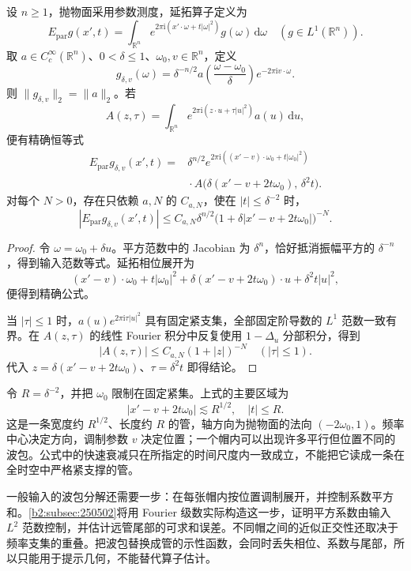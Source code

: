 \begin{proposition}[抛物面的单波包模型]\label{b2:prop:23-parabolic-packet}
设 \(n\geq1\)，抛物面采用参数测度，延拓算子定义为
\[
 E_{\mathrm{par}}g(x',t)
 =\int_{\mathbb R^n}e^{2\pi\mathrm i(x'\cdot\omega+t|\omega|^2)}
      g(\omega)\,\mathrm d\omega
 \quad(g\in L^1(\mathbb R^n)).
\]
取 \(a\in C_c^\infty(\mathbb R^n)\)、\(0<\delta\leq1\)、\(\omega_0,v\in\mathbb R^n\)，定义
\[
 g_{\delta,v}(\omega)
 =\delta^{-n/2}
   a\!\left(\frac{\omega-\omega_0}{\delta}\right)
   e^{-2\pi\mathrm i v\cdot\omega}.
\]
则 \(\|g_{\delta,v}\|_2=\|a\|_2\)。若
\[
 A(z,\tau)=\int_{\mathbb R^n}
       e^{2\pi\mathrm i(z\cdot u+\tau|u|^2)}a(u)\,\mathrm du,
\]
便有精确恒等式
\[
 \begin{aligned}
 E_{\mathrm{par}}g_{\delta,v}(x',t)
 ={}&\delta^{n/2}
 e^{2\pi\mathrm i((x'-v)\cdot\omega_0+t|\omega_0|^2)}\\
 &{}\cdot
 A\bigl(\delta(x'-v+2t\omega_0),\,\delta^2t\bigr).
 \end{aligned}
\]
对每个 \(N>0\)，存在只依赖 \(a,N\) 的 \(C_{a,N}\)，使在 \(|t|\leq\delta^{-2}\) 时，
\[
 |E_{\mathrm{par}}g_{\delta,v}(x',t)|
 \leq C_{a,N}\delta^{n/2}
       \bigl(1+\delta|x'-v+2t\omega_0|\bigr)^{-N}.
\]
\end{proposition}
\begin{proof}
令 \(\omega=\omega_0+\delta u\)。平方范数中的 Jacobian 为 \(\delta^n\)，恰好抵消振幅平方的 \(\delta^{-n}\)，得到输入范数等式。延拓相位展开为
\[
 (x'-v)\cdot\omega_0+t|\omega_0|^2
 +\delta(x'-v+2t\omega_0)\cdot u+\delta^2t|u|^2,
\]
便得到精确公式。

当 \(|\tau|\leq1\) 时，\(a(u)e^{2\pi\mathrm i\tau|u|^2}\) 具有固定紧支集，全部固定阶导数的 \(L^1\) 范数一致有界。在 \(A(z,\tau)\) 的线性 Fourier 积分中反复使用 \(1-\Delta_u\) 分部积分，得到
\[
 |A(z,\tau)|\leq C_{a,N}(1+|z|)^{-N}
 \quad(|\tau|\leq1).
\]
代入 \(z=\delta(x'-v+2t\omega_0)\)、\(\tau=\delta^2t\) 即得结论。
\end{proof}

令 \(R=\delta^{-2}\)，并把 \(\omega_0\) 限制在固定紧集。上式的主要区域为
\[
 |x'-v+2t\omega_0|\lesssim R^{1/2},\quad |t|\leq R.
\]
这是一条宽度约 \(R^{1/2}\)、长度约 \(R\) 的管，轴方向为抛物面的法向 \((-2\omega_0,1)\)。频率中心决定方向，调制参数 \(v\) 决定位置；一个帽内可以出现许多平行但位置不同的波包。公式中的快速衰减只在所指定的时间尺度内一致成立，不能把它读成一条在全时空中严格紧支撑的管。

\ProseParagraphBreak
一般输入的波包分解还需要一步：在每张帽内按位置调制展开，并控制系数平方和。\cref{b2:subsec:250502}将用 Fourier 级数实际构造这一步，证明平方系数由输入 \(L^2\) 范数控制，并估计远管尾部的可求和误差。不同帽之间的近似正交性还取决于频率支集的重叠。把波包替换成管的示性函数，会同时丢失相位、系数与尾部，所以只能用于提示几何，不能替代算子估计。

